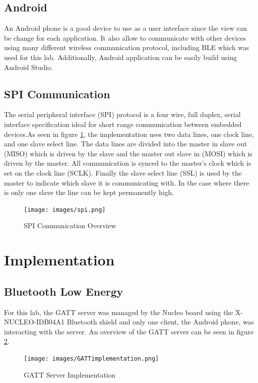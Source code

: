 \documentclass[12pt]{article}
\begin{document}
\subsection{Android}
An Android phone is a good device to use as a user interface since the view can be change for each application. It also allow to communicate with other devices using many different wireless communication protocol, including BLE which was used for this lab. Additionally, Android application can be easily build using Android Studio.

\subsection{SPI Communication}
The serial peripheral interface (SPI) protocol is a four wire, full duplex, serial interface specification ideal for short range communication between embedded devices.As seen in figure \ref{fig:spi}, the implementation uses two data lines, one clock line, and one slave select line. The data lines are divided into the master in slave out (MISO) which is driven by the slave and the master out slave in (MOSI) which is driven by the master. All communication is synced to the master's clock which is set on the clock line (SCLK). Finally the slave select line (SSL) is used by the master to indicate which slave it is communicating with. In the case where there is only one slave the line can be kept permanently high. 

\begin{figure}[!htb]
 \centering
 \texttt{[image: images/spi.png]}
 \caption{SPI Communication Overview}
 \label{fig:spi}
\end{figure}

\section{Implementation}
\subsection{Bluetooth Low Energy}
For this lab, the GATT server was managed by the Nucleo board using the X-NUCLEO-IDB04A1 Bluetooth shield and only one client, the Android phone, was interacting with the server. An overview of the GATT server can be seen in figure \ref{fig:gattimp}.

\begin{figure}[!htb]
 \centering
 \texttt{[image: images/GATTimplementation.png]}
 \caption{GATT Server Implementation}
 \label{fig:gattimp}
\end{figure}
\end{document}
